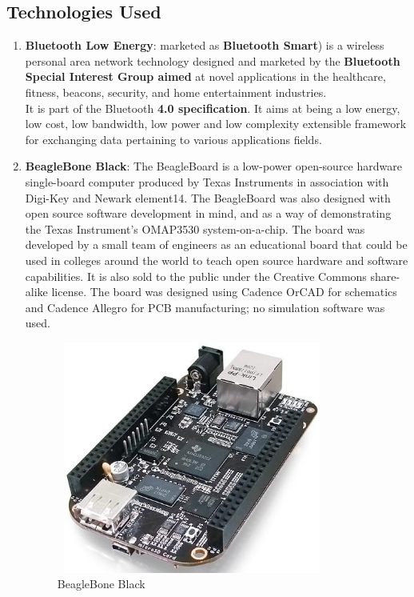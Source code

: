 \subsection{Technologies Used}
\begin{enumerate}
	\item \textbf{Bluetooth Low Energy}: marketed as \textbf{Bluetooth Smart}) is a wireless personal area network technology designed and marketed by the \textbf{Bluetooth Special Interest Group aimed} at novel applications in the healthcare, fitness, beacons, security, and home entertainment industries. \\
It is part of the Bluetooth \textbf{4.0 specification}. It aims at being a low energy, low cost, low bandwidth, low power and low complexity extensible framework for exchanging data pertaining to various applications fields.
	\item \textbf{BeagleBone Black}: The BeagleBoard is a low-power open-source hardware single-board computer produced by Texas Instruments in association with Digi-Key and Newark element14. The BeagleBoard was also designed with open source software development in mind, and as a way of demonstrating the Texas Instrument's OMAP3530 system-on-a-chip. The board was developed by a small team of engineers as an educational board that could be used in colleges around the world to teach open source hardware and software capabilities. It is also sold to the public under the Creative Commons share-alike license. The board was designed using Cadence OrCAD for schematics and Cadence Allegro for PCB manufacturing; no simulation software was used.\\
	\begin{figure}[ht]
	        \centering
	        \includegraphics[width=3.5in, height=3in]{images/beaglebone_black.png}
	        \caption{BeagleBone Black}

\end{figure}
\end{enumerate}
